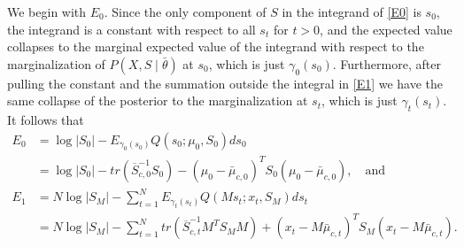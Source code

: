 \documentclass[12pt,leqno]{article}
\begin{document}
We begin with $E_0$. Since the only component of $S$ in the integrand of \eqref{E0} is $s_0$, the integrand is a constant
with respect to all $s_t$ for $t > 0$, and the expected value
collapses to the marginal 
expected value of the integrand with respect to the marginalization of $P(X,S\mid\bar{\theta})$ at $s_0$, which is just 
$\gamma_0(s_0)$.  Furthermore, after pulling the constant and the summation 
outside the integral in \eqref{E1} we have the same collapse of the posterior to the marginalization at $s_t$, which
is just $\gamma_t(s_t)$.  It follows that
\begin{align}
  E_0 &= \log|S_0| - E_{\gamma_0(s_0)}Q(s_0;\mu_0,S_0)ds_0 \\
  &= \log|S_0| - tr(\overline{S}_{c,0}^{-1}S_0) - (\mu_0-\bar{\mu}_{c,0})^TS_0(\mu_0 - \bar{\mu}_{c,0}),
  \label{E0:1}\quad\text{and}\\
  E_1 &= N\log|S_M| - \sum_{t=1}^NE_{\gamma_t(s_t)}Q(Ms_t;x_t,S_M)ds_t \\
  &= N\log|S_M| - \sum_{t=1}^Ntr(\overline{S}_{c,t}^{-1}M^TS_MM) + (x_t-M\bar{\mu}_{c,t})^TS_M(x_t-M\bar{\mu}_{c,t})\label{E1:1}.
\end{align}
\end{document}
